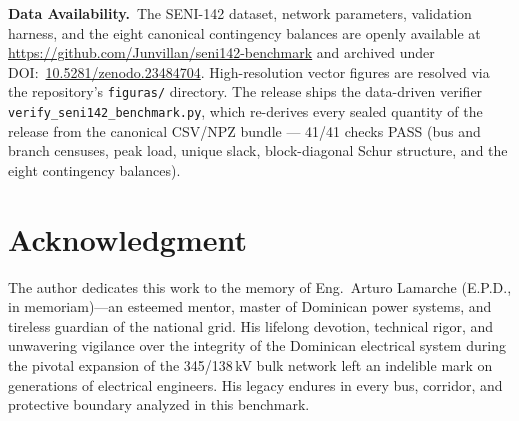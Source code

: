 \documentclass[11pt, journal, onecolumn]{IEEEtran}
\begin{document}





\noindent\textbf{Data Availability.}~The SENI-142 dataset, network parameters, validation harness, and the eight canonical contingency balances are openly available at \url{https://github.com/Junvillan/seni142-benchmark} and archived under DOI:~\href{https://doi.org/10.5281/zenodo.23484704}{10.5281/zenodo.23484704}. High-resolution vector figures are resolved via the repository's \texttt{figuras/} directory. The release ships the data-driven verifier \texttt{verify\_seni142\_benchmark.py}, which re-derives every sealed quantity of the release from the canonical CSV/NPZ bundle --- 41/41 checks PASS (bus and branch censuses, peak load, unique slack, block-diagonal Schur structure, and the eight contingency balances).


\section*{Acknowledgment}
The author dedicates this work to the memory of Eng.~Arturo Lamarche (E.P.D., in memoriam)---an esteemed mentor, master of Dominican power systems, and tireless guardian of the national grid. His lifelong devotion, technical rigor, and unwavering vigilance over the integrity of the Dominican electrical system during the pivotal expansion of the 345/138\,kV bulk network left an indelible mark on generations of electrical engineers. His legacy endures in every bus, corridor, and protective boundary analyzed in this benchmark.




\end{document}
